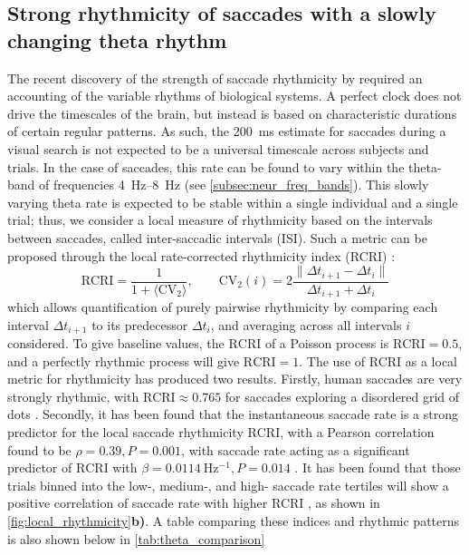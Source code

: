 \subsection*{Strong rhythmicity of saccades with a slowly changing theta rhythm}
The recent discovery of the strength of saccade rhythmicity by \textcite{naher_primate_saccades} required an accounting of the variable rhythms of biological systems. A perfect clock does not drive the timescales of the brain, but instead is based on characteristic durations of certain regular patterns. As such, the \qty{200}{\milli \second} estimate for saccades during a visual search is not expected to be a universal timescale across subjects and trials. In the case of saccades, this rate can be found to vary within the theta-band of frequencies \qtyrange{4}{8}{\hertz} (see \cref{subsec:neur_freq_bands}). This slowly varying theta rate is expected to be stable within a single individual and a single trial; thus, we consider a local measure of rhythmicity based on the intervals between saccades, called inter-saccadic intervals (ISI). Such a metric can be proposed through the local rate-corrected rhythmicity index (RCRI) \cite{naher_primate_saccades}:
\begin{equation}\label{eq:RCRI}
	\text{RCRI} = \frac{1}{1 + \langle \text{CV}_2 \rangle}, \qquad \text{CV}_2(i) = 2\frac{\|\Delta t_{i+1} - \Delta t_{i} \|}{\Delta t_{i+1} + \Delta t_{i}}
\end{equation}
which allows quantification of purely pairwise rhythmicity by comparing each interval $\Delta t_{i+1}$ to its predecessor $\Delta t_{i}$, and averaging across all intervals $i$ considered. To give baseline values, the $\text{RCRI}$ of a Poisson process is $\text{RCRI}=0.5$, and a perfectly rhythmic process will give $\text{RCRI}=1$. The use of RCRI as a local metric for rhythmicity has produced two results. Firstly, human saccades are very strongly rhythmic, with $\text{RCRI} \approx 0.765$ for saccades exploring a disordered grid of dots \cite{naher_primate_saccades}. Secondly, it has been found that the instantaneous saccade rate is a strong predictor for the local saccade rhythmicity $\text{RCRI}$, with a Pearson correlation found to be $\rho=0.39, P=0.001$, with saccade rate acting as a significant predictor of $\text{RCRI}$ with $\beta=\qty{0.0114}{\hertz^{-1}}, P=0.014$ \cite{naher_primate_saccades}. It has been found that those trials binned into the low-, medium-, and high- saccade rate tertiles will show a positive correlation of saccade rate with higher RCRI \cite{naher_primate_saccades}, as shown in \cref{fig:local_rhythmicity}\textbf{b)}. A table comparing these indices and rhythmic patterns is also shown below in \cref{tab:theta_comparison}

